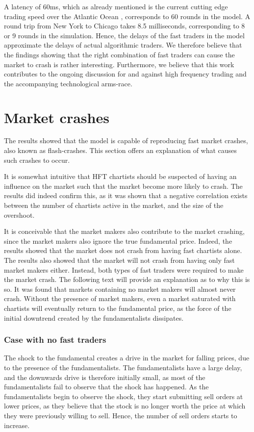 A latency of 60ms, which as already mentioned is the current cutting edge trading speed over the Atlantic Ocean \cite{williams2011cable, phillips2012cable}, corresponds to 60 rounds in the model. A round trip from New York to Chicago takes 8.5 milliseconds\cite{adler2012cable}, corresponding to 8 or 9 rounds in the simulation. Hence, the delays of the fast traders in the model approximate the delays of actual algorithmic traders. We therefore believe that the findings showing that the right combination of fast traders can cause the market to crash is rather interesting. Furthermore, we believe that this work contributes to the ongoing discussion for and against high frequency trading and the accompanying technological arms-race. 


\section{Market crashes}
The results showed that the model is capable of reproducing fast market crashes, also known as flash-crashes. This section offers an explanation of what causes such crashes to occur.

It is somewhat intuitive that HFT chartists should be suspected of having an influence on the market such that the market become more likely to crash. The results did indeed confirm this, as it was shown that a negative correlation exists between the number of chartists active in the market, and the size of the overshoot. 

It is conceivable that the market makers also contribute to the market crashing, since the market makers also ignore the true fundamental price. Indeed, the results showed that the market does not crash from having fast chartists alone. The results also showed that the market will not crash from having only fast market makers either. Instead, both types of fast traders were required to make the market crash. The following text will provide an explanation as to why this is so. It was found that markets containing no market makers will almost never crash. Without the presence of market makers, even a market saturated with chartists will eventually return to the fundamental price, as the force of the initial downtrend created by the fundamentalists dissipates. 


\subsubsection*{Case with no fast traders}
The shock to the fundamental creates a drive in the market for falling prices, due to the presence of the fundamentalists. The fundamentalists have a large delay, and the downwards drive is therefore initially small, as most of the fundamentalists fail to observe that the shock has happened. As the fundamentalists begin to observe the shock, they start submitting sell orders at lower prices, as they believe that the stock is no longer worth the price at which they were previously willing to sell. Hence, the number of sell orders starts to increase. 


